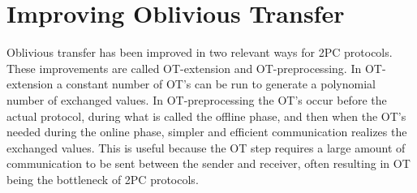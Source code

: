 \section{Improving Oblivious Transfer}
Oblivious transfer has been improved in two relevant ways for 2PC protocols. 
These improvements are called OT-extension and OT-preprocessing. 
In OT-extension a constant number of OT's can be run to generate a polynomial number of exchanged values.
In OT-preprocessing the OT's occur before the actual protocol, during what is called the offline phase, and then when the OT's needed during the online phase, simpler and efficient communication realizes the exchanged values.
This is useful because the OT step requires a large amount of communication to be sent between the sender and receiver, often resulting in OT being the bottleneck of 2PC protocols.

